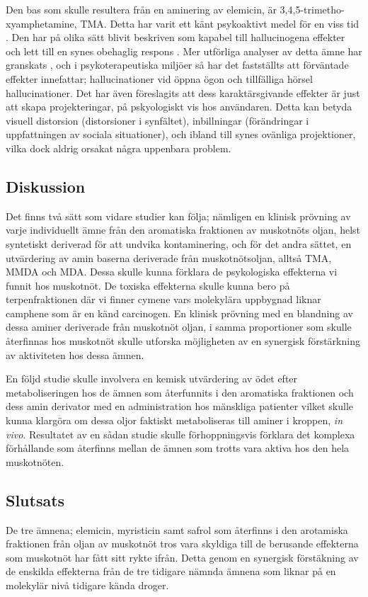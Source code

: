 \documentclass{theme/franska}
\begin{document}
{	Den bas som skulle resultera från en aminering av elemicin, är
	3,4,5-trimetho-xyamphetamine, TMA. Detta har varit ett känt psykoaktivt medel för en viss tid \cite{peretz1955new}.
	Den har på olika sätt blivit beskriven som kapabel till hallucinogena effekter
	och lett till en synes obehaglig respons \cite{shulgin1995pihkal}.
	Mer utförliga analyser av detta ämne har granskats \cite{shulgin1995pihkal}, och i psykoterapeutiska miljöer så har det fastställts att förväntade effekter innefattar; hallucinationer vid öppna ögon och tillfälliga hörsel hallucinationer.
	Det har även föreslagits att dess karaktärsgivande effekter är just att skapa projekteringar, på pskyologiskt vis hos användaren.
	Detta kan betyda visuell distorsion (distorsioner i synfältet), inbillningar (förändringar i uppfattningen av sociala situationer), och ibland till synes ovänliga projektioner, vilka dock aldrig orsakat några uppenbara problem.

	\subsection{Diskussion}

Det finns två sätt som vidare studier kan följa; nämligen en klinisk prövning
av varje individuellt ämne från den aromatiska fraktionen av muskotnöts oljan,
helst syntetiskt deriverad för att undvika kontaminering, och för det andra sättet,
en utvärdering av amin baserna deriverade från muskotnötsoljan, alltså
TMA, MMDA och MDA. Dessa skulle kunna förklara de psykologiska effekterna
vi funnit hos muskotnöt. De toxiska effekterna skulle kunna bero på terpenfraktionen
där vi finner cymene vars molekylära uppbygnad liknar camphene som är en känd
carcinogen. En klinisk prövning med en blandning av dessa aminer deriverade från
muskotnöt oljan, i samma proportioner som skulle återfinnas hos muskotnöt skulle
utforska möjligheten av en synergisk förstärkning av aktiviteten hos dessa ämnen.

En följd studie skulle involvera en kemisk utvärdering av ödet efter metaboliseringen
hos de ämnen som återfunnits i den aromatiska fraktionen och dess amin derivator
med en administration hos mänskliga patienter vilket skulle kunna klargöra om dessa
oljor faktiskt metaboliseras till aminer i kroppen, \textit{in vivo}.
Resultatet av en sådan studie skulle förhoppningsvis förklara det
komplexa förhållande som återfinns mellan de ämnen som trotts vara aktiva
hos den hela muskotnöten.

\subsection{Slutsats}
De tre ämnena; elemicin, myristicin samt safrol som återfinns i den arotamiska fraktionen från oljan av muskotnöt tros vara skyldiga till de berusande effekterna som muskotnöt har fått sitt rykte ifrån.
Detta genom en synergisk förstäkning av de enskilda effekterna från de tre tidigare nämnda ämnena som liknar på en molekylär nivå tidigare kända droger.







}
\end{document}
